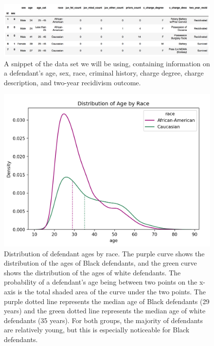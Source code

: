 \documentclass[water,article,submit,moreauthors,pdftex]{mdpi}
\begin{document}
\begin{figure}

{\centering \includegraphics[width=1\linewidth]{../images/table_snippet} 

}

\caption{A snippet of the data set we will be using, containing information on a defendant's age, sex, race, criminal history, charge degree, charge description, and two-year recidivism outcome.}\label{fig:table snip}
\end{figure}

\begin{figure}

{\centering \includegraphics[width=1\linewidth]{../images/age_race_plot_new} 

}

\caption{Distribution of defendant ages by race. The purple curve shows the distribution of the ages of Black defendants, and the green curve shows the distribution of the ages of white defendants. The probability of a defendant's age being between two points on the x-axis is the total shaded area of the curve under the two points. The purple dotted line represents the median age of Black defendants (29 years) and the green dotted line represents the median age of white defendants (35 years). For both groups, the majority of defendants are relatively young, but this is especially noticeable for Black defendants.}\label{fig:age plot}
\end{figure}
\end{document}
